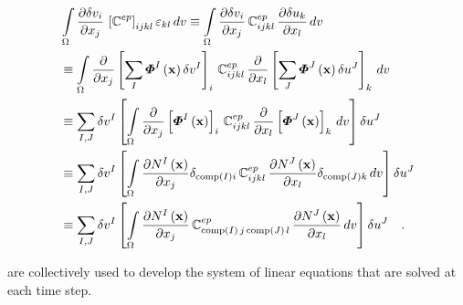 \documentclass[]{scrartcl}
\begin{document}
\begin{align}
&\int\limits_{\Omega} \frac{\partial \delta v_{i}}{\partial x_{j}} \, \left[ \boldsymbol{\mathbb{C}}^{ep} \right]_{ijkl} \varepsilon_{kl} \, dv
  \equiv \int\limits_{\Omega} \frac{\partial \delta v_{i}}{\partial x_{j}} \, \mathbb{C}^{ep}_{ijkl} \, \frac{\partial \delta u_{k}}{\partial x_{l}} \, dv \notag\\
  &\equiv \int\limits_{\Omega} \frac{\partial}{\partial x_{j}} \left[ \sum\limits_{I} \boldsymbol{\varPhi}^{I} \left( \mathbf{x} \right) \delta v^{I} \right]_{i} \, \mathbb{C}^{ep}_{ijkl} \, \frac{\partial}{\partial x_{l}} \left[ \sum\limits_{J} \boldsymbol{\varPhi}^{J} \left( \mathbf{x} \right) \delta u^{J} \right]_{k} \, dv \notag\\
  &\equiv \sum\limits_{I,J} \delta v^{I} \left[ \int\limits_{\Omega} \frac{\partial}{\partial x_{j}} \left[  \boldsymbol{\varPhi}^{I} \left( \mathbf{x} \right)  \right]_{i} \, \mathbb{C}^{ep}_{ijkl} \, \frac{\partial}{\partial x_{l}} \left[ \boldsymbol{\varPhi}^{J} \left( \mathbf{x} \right)  \right]_{k} \, dv \right] \delta u^{J} \notag\\
  &\equiv \sum\limits_{I,J} \delta v^{I} \left[ \int\limits_{\Omega} \frac{\partial N^{I} \left( \mathbf{x} \right)}{\partial x_{j}} \delta_{\textnormal{comp}(I) i}  \, \mathbb{C}^{ep}_{ijkl} \, \frac{\partial  N^{J} \left( \mathbf{x} \right)}{\partial x_{l}} \delta_{\textnormal{comp}(J) k} \, dv \right] \delta u^{J} \notag\\
  &\equiv \sum\limits_{I,J} \delta v^{I} \left[ \int\limits_{\Omega} \frac{\partial N^{I} \left( \mathbf{x} \right)}{\partial x_{j}}  \, \mathbb{C}^{ep}_{\textnormal{comp}(I) \,j \, \textnormal{comp}(J) \, l} \, \frac{\partial  N^{J} \left( \mathbf{x} \right)}{\partial x_{l}} \, dv \right] \delta u^{J}
\label{equ: Discretisation: Material tangent}
\quad .
\end{align}

 are collectively used to develop the system of linear equations that are solved at each time step.


 
\end{document}
